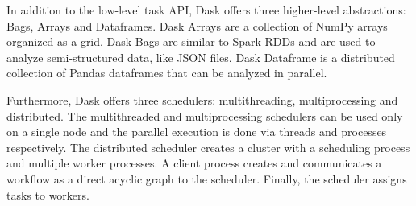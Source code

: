 In addition to the low-level task API, Dask offers three higher-level abstractions: Bags, Arrays and Dataframes.
Dask Arrays are a collection of NumPy arrays organized as a grid.
Dask Bags are similar to Spark RDDs and are used to analyze semi-structured data, like JSON files.
Dask Dataframe is a distributed collection of Pandas dataframes that can be analyzed in parallel.

Furthermore, Dask offers three schedulers: multithreading, multiprocessing and distributed.
The multithreaded and multiprocessing schedulers can be used only on a single node and the parallel execution is done via threads and processes respectively.
The distributed scheduler creates a cluster with a scheduling process and multiple worker processes.
A client process creates and communicates a workflow as a direct acyclic graph to the scheduler.
Finally, the scheduler assigns tasks to workers.




